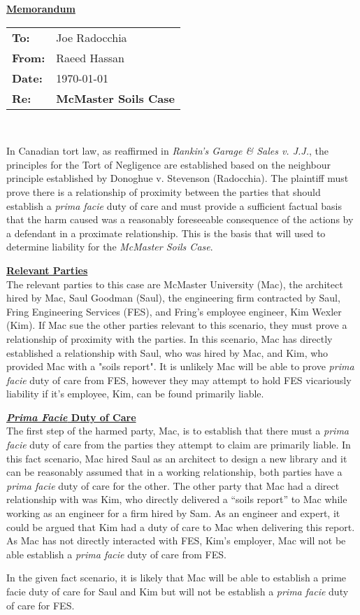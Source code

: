\documentclass[12pt,letterpaper]{article}
\begin{document}
\begin{center}
	\textbf{\underline{Memorandum}}
\end{center}
\begin{tabular}{ll}
	\textbf{To:}	& Joe Radocchia\\
	\textbf{From:}	& Raeed Hassan\\
	\textbf{Date:}	& \today\\
	\textbf{Re:}	& \textbf{McMaster Soils Case}\\
\end{tabular}
\\\par
In Canadian tort law, as reaffirmed in \textit{Rankin's Garage \& Sales v. J.J.}, the principles for the Tort of Negligence are established based on the neighbour principle established by Donoghue v. Stevenson (Radocchia). The plaintiff must prove there is a relationship of proximity between the parties that should establish a \textit{prima facie} duty of care and must provide a sufficient factual basis that the harm caused was a reasonably foreseeable consequence of the actions by a defendant in a proximate relationship. This is the basis that will used to determine liability for the \textit{McMaster Soils Case}.

\par
\textbf{\underline{Relevant Parties}}\\
\indent
The relevant parties to this case are McMaster University (Mac), the architect hired by Mac, Saul Goodman (Saul), the engineering firm contracted by Saul, Fring Engineering Services (FES), and Fring's employee engineer, Kim Wexler (Kim). If Mac sue the other parties relevant to this scenario, they must prove a relationship of proximity with the parties. In this scenario, Mac has directly established a relationship with Saul, who was hired by Mac, and Kim, who provided Mac with a "soils report". It is unlikely Mac will be able to prove \textit{prima facie} duty of care from FES, however they may attempt to hold FES vicariously liability if it's employee, Kim, can be found primarily liable.

\par
\textbf{\underline{\textit{Prima Facie} Duty of Care}}\\
\indent
The first step of the harmed party, Mac, is to establish that there must a \textit{prima facie} duty of care from the parties they attempt to claim are primarily liable. In this fact scenario, Mac hired Saul as an architect to design a new library and it can be reasonably assumed that in a working relationship, both parties have a \textit{prima facie} duty of care for the other. The other party that Mac had a direct relationship with was Kim, who directly delivered a “soils report” to Mac while working as an engineer for a firm hired by Sam. As an engineer and expert, it could be argued that Kim had a duty of care to Mac when delivering this report. As Mac has not directly interacted with FES, Kim's employer, Mac will not be able establish a \textit{prima facie} duty of care from FES.\par
In the given fact scenario, it is likely that Mac will be able to establish a prime facie duty of care for Saul and Kim but will not be establish a \textit{prima facie} duty of care for FES.
\end{document}
